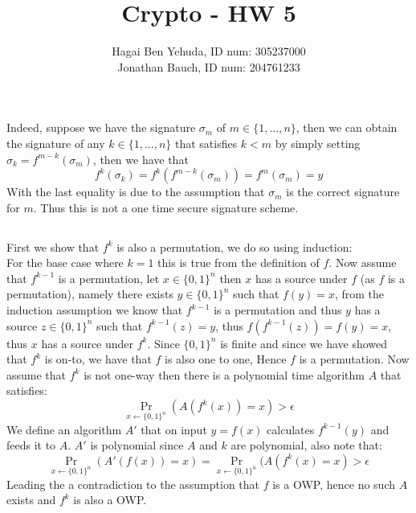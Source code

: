 \documentclass{article}
\title{Crypto - HW 5}
\author{Hagai Ben Yehuda, ID num: 305237000\\ Jonathan Bauch, ID num: 204761233}
\date{}
\begin{document}
  \maketitle

\section{}%
\subsection{}%
Indeed, suppose we have the signature $\sigma_m$ of $m\in\{1,..., n\}$, then we can obtain the signature of any $k \in\{1,...,n\}$ that satisfies $k < m$ by simply setting $\sigma_k = f^{m-k}(\sigma_m)$, then we have that 
\[f^{k}(\sigma_k) = f^{k}(f^{m-k}(\sigma_m)) = f^{m}(\sigma_m) = y\]
With the last equality is due to the assumption that $\sigma_m$ is the correct signature for $m$.
Thus this is not a one time secure signature scheme.

\subsection{}%
First we show that $f^k$ is also a permutation, we do so using induction:\\
For the base case where $k = 1$ this is true from the definition of $f$.
Now assume that $f^{k-1}$ is a permutation, let $x\in\{0,1\}^n$ then $x$ has a source under $f$ (as $f$ is a permutation), namely there exists $y\in\{0,1\}^n$ such that $f(y) = x$, from the induction assumption we know that $f^{k-1}$ is a permutation and thus $y$ has a source $z\in\{0,1\}^n$ such that $f^{k-1}(z) = y$, thus $f(f^{k-1}(z)) = f(y) = x$, thus $x$ has a source under $f^k$.
Since $\{0,1\}^n$ is finite and since we have showed that $f^k$ is on-to, we have that $f$ is also one to one, Hence $f$ is a permutation.
Now assume that $f^k$ is not  one-way then there is a polynomial time algorithm $A$ that satisfies: 
\[\Pr_{x\leftarrow \{0,1\}^n}(A(f^k(x)) = x) > \epsilon\]
We define an algorithm $A'$ that on input $y=f(x)$ calculates $f^{k-1}(y)$ and feeds it to $A$. $A'$ is polynomial since $A$ and $k$ are polynomial, also note that:
\[\Pr_{x\leftarrow \{0,1\}^n}(A'(f(x)) = x) = \Pr_{x\leftarrow \{0,1\}^n}(A(f^k(x) = x) > \epsilon\]
Leading the a contradiction to the assumption that $f$ is a OWP, hence no such $A$ exists and $f^k$ is also a OWP.
\end{document}
